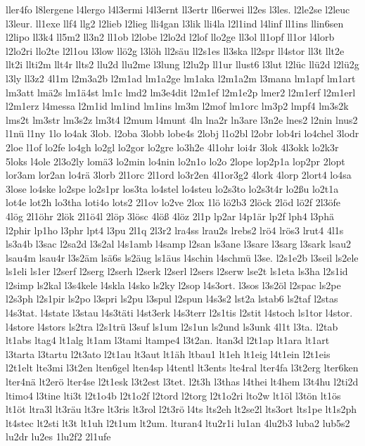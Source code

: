 {ller4fo
l8lergene
l4lergo
l4l3ermi
l4l3ernt
ll3ertr
ll6erwei
ll2es
l3les.
l2le2se
l2leuc
l3leur.
ll1exe
llf4
llg2
l2lieb
l2lieg
lli4gan
l3lik
lli4la
l2l1ind
l4linf
ll1ins
llin6sen
l2lipo
ll3k4
ll5m2
ll3n2
ll1ob
l2lobe
l2lo2d
l2lof
llo2ge
ll3ol
ll1opf
ll1or
l4lorb
l2lo2ri
llo2te
l2l1ou
l3low
llö2g
l3löh
ll2säu
ll2s1es
ll3ska
ll2spr
ll4stor
ll3t
llt2e
llt2i
llti2m
llt4r
llts2
llu2d
llu2me
l3lung
l2lu2p
ll1ur
llust6
l3lut
l2lüc
llü2d
l2lü2g
l3ly
ll3z2
4l1m
l2m3a2b
l2m1ad
lm1a2ge
lm1aka
l2m1a2m
l3mana
lm1apf
lm1art
lm3att
lmä2s
lm1ä4st
lm1c
lmd2
lm3e4dit
l2m1ef
l2m1e2p
lmer2
l2m1erf
l2m1erl
l2m1erz
l4messa
l2m1id
lm1ind
lm1ins
lm3m
l2mof
lm1orc
lm3p2
lmpf4
lm3s2k
lms2t
lm3str
lm3s2z
lm3t4
l2mum
l4munt
4ln
lna2r
ln3are
l3n2e
lnes2
l2nin
lnus2
l1nü
l1ny
1lo
lo4ak
3lob.
l2oba
3lobb
lobe4s
2lobj
l1o2bl
l2obr
lob4ri
lo4chel
3lodr
2loe
l1of
lo2fe
lo4gh
lo2gl
lo2gor
lo2gre
lo3h2e
4l1ohr
loi4r
3lok
4l3okk
lo2k3r
5loks
l4ole
2l3o2ly
lomä3
lo2min
lo4nin
lo2n1o
lo2o
2lope
lop2p1a
lop2pr
2lopt
lor3am
lor2an
lo4rä
3lorb
2l1orc
2l1ord
lo3r2en
4l1or3g2
4lork
4lorp
2lort4
lo4sa
3lose
lo4ske
lo2spe
lo2s1pr
los3ta
lo4stel
lo4steu
lo2s3to
lo2s3t4r
lo2ßu
lo2t1a
lot4e
lot2h
lo3tha
loti4o
lots2
2l1ov
lo2ve
2lox
1lö
lö2b3
2löck
2löd
lö2f
2l3öfe
4lög
2l1öhr
2lök
2l1ö4l
2löp
3lösc
4löß
4löz
2l1p
lp2ar
l4p1är
lp2f
lph4
l3phä
l2phir
lp1ho
l3phr
lpt4
l3pu
2l1q
2l3r2
lra4ss
lrau2s
lrebs2
lrö4
lrös3
lrut4
4l1s
ls3a4b
l3sac
l2sa2d
l3s2al
l4s1amb
l4samp
l2san
ls3ane
l3sare
l3sarg
l3sark
lsau2
lsau4m
lsau4r
l3s2äm
lsä6s
ls2äug
ls1äus
l4schin
l4schmü
l3se.
l2s1e2b
l3seil
ls2ele
ls1eli
ls1er
l2serf
l2serg
l2serh
l2serk
l2serl
l2sers
l2serw
lse2t
ls1eta
ls3ha
l2s1id
l2simp
ls2kal
l3s4kele
l4skla
l4sko
ls2ky
l2sop
l4s3ort.
l3sos
l3s2öl
l2spac
ls2pe
l2s3ph
l2s1pir
ls2po
l3spri
ls2pu
l3spul
l2spun
l4s3s2
lst2a
lstab6
ls2taf
l2stas
l4s3tat.
l4state
l3stau
l4s3täti
l4st3erk
l4s3terr
l2s1tis
l2stit
l4stoch
ls1tor
l4stor.
l4store
l4stors
ls2tra
l2s1trü
l3suf
ls1um
l2s1un
ls2und
ls3unk
4l1t
l3ta.
l2tab
lt1abs
ltag4
lt1alg
lt1am
l3tami
ltampe4
l3t2an.
ltan3d
l2t1ap
lt1ara
lt1art
l3tarta
l3tartu
l2t3ato
l2t1au
lt3aut
lt1äh
ltbau1
lt1eh
lt1eig
l4t1ein
l2t1eis
l2t1elt
lte3mi
l3t2en
lten6gel
lten4sp
l4tentl
lt3ents
lte4ral
lter4fa
l3t2erg
lter6ken
lter4nä
lt2erö
lter4se
l2t1esk
l3t2est
l3tet.
l2t3h
l3thas
l4thei
lt4hem
l3t4hu
l2ti2d
ltimo4
l3tine
lti3t
l2t1o4b
l2t1o2f
l2tord
l2torg
l2t1o2ri
lto2w
lt1öl
l3tön
lt1ös
lt1öt
ltra3l
lt3räu
lt3re
lt3ris
lt3rol
l2t3rö
l4ts
lts2eh
lt2se2l
lts3ort
lts1pe
lt1s2ph
lt4stec
lt2sti
lt3t
lt1uh
l2t1um
lt2um.
lturan4
ltu2r1i
lu1an
4lu2b3
luba2
lub5s2
lu2dr
lu2es
1lu2f2
2l1ufe
}
